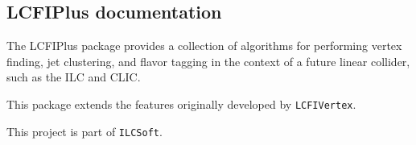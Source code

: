 \subsection*{L\-C\-F\-I\-Plus documentation}

The L\-C\-F\-I\-Plus package provides a collection of algorithms for performing vertex finding, jet clustering, and flavor tagging in the context of a future linear collider, such as the I\-L\-C and C\-L\-I\-C.

This package extends the features originally developed by {\tt L\-C\-F\-I\-Vertex}.

This project is part of {\tt I\-L\-C\-Soft}. 